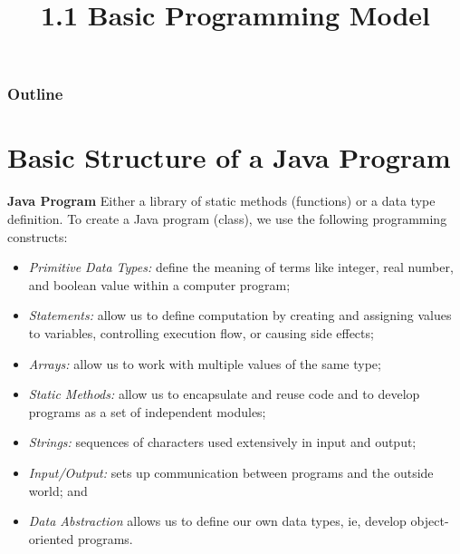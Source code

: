 \documentclass[8pt,a4paper,compress]{beamer}
\title{1.1 Basic Programming Model}
\date{}
\begin{document}
\begin{frame}
\vfill
\titlepage
\end{frame}

\begin{frame}
\frametitle{Outline}
\tableofcontents
\end{frame}

\section{Basic Structure of a Java Program}

\begin{frame}[fragile]
\pause

\textbf{Java Program} Either a library of static methods (functions) or a data type definition. To create a Java program (class), we use the following programming constructs:
\begin{itemize}
\item \emph{Primitive Data Types:} define the meaning of terms like integer, real number, and boolean value within a computer program; 
\item \emph{Statements:} allow us to define computation by creating and assigning values to variables, controlling execution flow, or causing side effects; 
\item \emph{Arrays:} allow us to work with multiple values of the same type; 
\item \emph{Static Methods:} allow us to encapsulate and reuse code and to develop programs as a set of independent modules; 
\item \emph{Strings:} sequences of characters used extensively in input and output; 
\item \emph{Input/Output:} sets up communication between programs and the outside world; and 
\item \emph{Data Abstraction} allows us to define our own data types, ie, develop object-oriented programs.
\end{itemize}

\end{frame}
\end{document}
